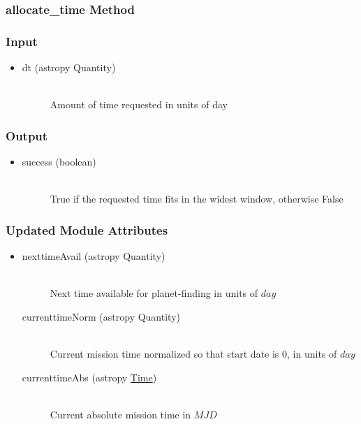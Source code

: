 \documentclass[cleanfoot]{asme2ej}
\begin{document}
\subsubsection{allocate\_time Method} \label{sec:allocatetimetask}

\subsubsection*{Input}
\begin{itemize}
\item 
\begin{description}
    \item[dt (astropy Quantity)] \hfill \\ Amount of time requested in units of day
\end{description}
\end{itemize}

\subsubsection*{Output}
\begin{itemize}
\item 
\begin{description}
    \item[success (boolean)] \hfill \\ True if the requested time fits in the widest window, otherwise False
\end{description}
\end{itemize}

\subsubsection*{Updated Module Attributes}
\begin{itemize}
\item 
\begin{description}
    \item[nexttimeAvail (astropy Quantity)] \hfill \\ Next time available for planet-finding in units of $ day $
    \item[currenttimeNorm (astropy Quantity)] \hfill \\ Current mission time normalized so that start date is 0, in units of $ day $
    \item[currenttimeAbs (astropy \href{http://astropy.readthedocs.org/en/latest/time/index.html}{Time})] \hfill \\ Current absolute mission time in $ MJD $
\end{description}
\end{itemize}
\end{document}
